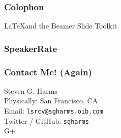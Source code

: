 \documentclass[slidestop,compress,mathserif]{beamer}
\begin{document}
\begin{frame}
	\frametitle{Colophon}
	\LaTeX and the Beamer Slide Toolkit
\end{frame}

\begin{frame}
	\frametitle{SpeakerRate}
	\vskip 1.25cm
\end{frame}

\begin{frame}
	\frametitle{Contact Me! (Again)}
	\begin{center}
		Steven G. Harms \\
		\vskip 1.25cm
		Physically:  San Francisco, CA\\
		Email:  \texttt{lsrcv@sgharms.oib.com} \\
		Twitter / GitHub:  \texttt{sgharms} \\
		G+
	\end{center}
\end{frame}
\end{document}
